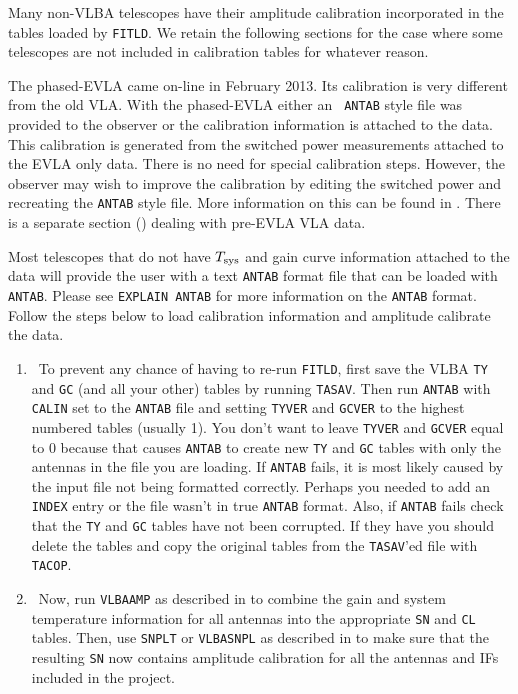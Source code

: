 
Many non-VLBA telescopes have their amplitude calibration incorporated
in the tables loaded by {\tt FITLD}\@. We retain the following sections
for the case where some telescopes are not included in calibration
tables for whatever reason.

The phased-EVLA came on-line in February 2013.   Its calibration is
very different from the old VLA.  With the phased-EVLA either an {\tt
ANTAB} style file was provided to the observer or the calibration
information is attached to the data.  This calibration is generated from
the switched power measurements attached to the EVLA only data.
There is no need for special calibration steps.  However, the observer may
wish to improve the calibration by editing the switched power and recreating
the {\tt ANTAB} style file.  More information on this can be found in
.  There is a separate section () dealing with
pre-EVLA VLA data.


Most telescopes that do not have $T_{\rm sys}$ and gain curve
information attached to the data will provide the user with a text
{\tt ANTAB} format file that can be loaded with {\tt ANTAB}\@.  Please
see {\tt EXPLAIN ANTAB} for more information on the {\tt ANTAB}
format.   Follow the steps below to load calibration
information and amplitude calibrate the data.
\begin{enumerate}

\item\ {To prevent any chance of having to re-run {\tt FITLD},
first save the VLBA {\tt TY} and {\tt GC} (and all your other)
tables by running {\tt TASAV}\@.  Then run {\tt ANTAB} with {\tt CALIN}
set to the {\tt ANTAB} file and setting {\tt TYVER} and {\tt GCVER}
to the highest numbered tables (usually 1).  You don't want to leave
{\tt TYVER} and {\tt GCVER} equal to 0 because that causes {\tt ANTAB}
to create new {\tt TY} and {\tt GC} tables with only the antennas in the
file you are loading.  If {\tt ANTAB} fails, it is
most likely caused by the input file not being formatted correctly.
Perhaps you needed to add an {\tt INDEX} entry or the file wasn't in true
{\tt ANTAB} format.  Also, if {\tt ANTAB} fails check that the {\tt TY}
and {\tt GC} tables have not been corrupted.  If they have you should
delete the tables and copy the original tables from the {\tt TASAV}'ed
file with {\tt TACOP}}\@.

\item\ {Now, run {\tt VLBAAMP} as described in  to
combine the gain and system temperature information for all antennas
into the appropriate {\tt SN} and {\tt CL} tables.  Then, use
{\tt SNPLT} or {\tt VLBASNPL} as described in  to make
sure that the resulting {\tt SN} now contains amplitude calibration
for all the antennas and IFs included in the project.}

\end{enumerate}

